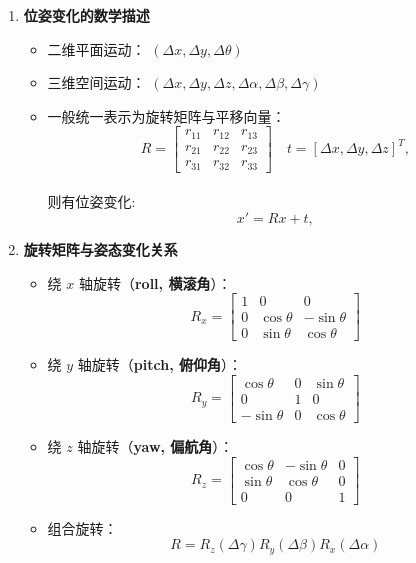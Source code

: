 \documentclass[../main.tex]{subfiles}
\begin{document}
\begin{enumerate}
    \item \textbf{位姿变化的数学描述}
    \begin{itemize}
        \item 二维平面运动： \((\Delta x, \Delta y, \Delta \theta)\)
        \item 三维空间运动： \((\Delta x, \Delta y, \Delta z, \Delta \alpha, \Delta \beta, \Delta \gamma)\)
        \item 一般统一表示为旋转矩阵与平移向量：
        \[
        R =
        \begin{bmatrix}
            r_{11} & r_{12} & r_{13} \\
            r_{21} & r_{22} & r_{23} \\
            r_{31} & r_{32} & r_{33}
        \end{bmatrix}
        \quad
        t = [\Delta x, \Delta y, \Delta z]^T,
        \]
        \\则有位姿变化:
        \[
        x' = R x + t,
        \]
    \end{itemize}
    \item \textbf{旋转矩阵与姿态变化关系}
    \begin{itemize}
        \item 绕 $x$ 轴旋转（\textbf{roll, 横滚角}）：
        \[
        R_x =
        \begin{bmatrix}
            1 & 0 & 0 \\
            0 & \cos\theta & -\sin\theta \\
            0 & \sin\theta & \cos\theta
        \end{bmatrix}
        \]
        \item 绕 $y$ 轴旋转（\textbf{pitch, 俯仰角}）：
        \[
        R_y =
        \begin{bmatrix}
            \cos\theta & 0 & \sin\theta \\
            0 & 1 & 0 \\
            -\sin\theta & 0 & \cos\theta
        \end{bmatrix}
        \]
        \item 绕 $z$ 轴旋转（\textbf{yaw, 偏航角}）：
        \[
        R_z =
        \begin{bmatrix}
            \cos\theta & -\sin\theta & 0 \\
            \sin\theta & \cos\theta & 0 \\
            0 & 0 & 1
        \end{bmatrix}
        \]
        \item 组合旋转：  
        \[
        R = R_z(\Delta\gamma) R_y(\Delta\beta) R_x(\Delta\alpha)
        \]
    \end{itemize}


\end{enumerate}
\end{document}

